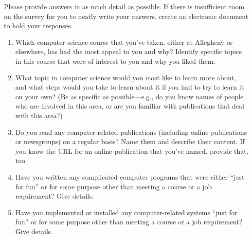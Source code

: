 


Please provide answers in as much detail as possible. If there is insufficient
room on the survey for you to neatly write your answers, create an electronic
document to hold your responses.

\begin{enumerate}
\item
Which computer science course that you've taken, either 
at Allegheny or elsewhere, has had the most appeal to 
you and why?  Identify specific topics in this course 
that were of interest to you and why you liked them.

\vspace{1.5in}

\item
What topic in computer science would you most like to learn more about,
and what steps would you take to learn about it if you had to try to 
learn it on your own? (Be as specific as possible---e.g., do you know names
of people who are involved in this area, or are you familiar with
publications that deal with this area?)

\vspace{1.5in}

\item
Do you read any computer-related publications (including 
online publications or newsgroups) on a regular basis? 
Name them and describe their content.  If you know the 
URL for an online publication that you've named, provide 
that, too 

\vspace{1.5in}

\item
Have you written any complicated computer programs that 
were either ``just for fun'' or for some purpose other 
than meeting a course or a job requirement? Give details.

\vspace{1.5in}

\item
Have you implemented or installed any computer-related 
systems ``just for fun'' or for some purpose other than 
meeting a course or a job requirement? Give details.

\vspace{1.5in}


\end{enumerate}
